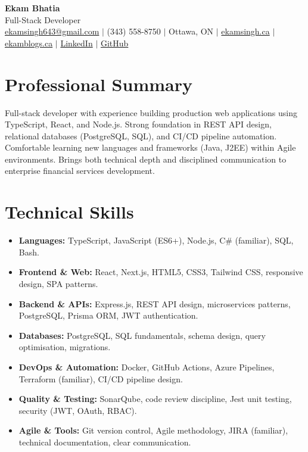 \documentclass[11pt,a4paper]{article}
\begin{document}
\begin{center}
    {\LARGE \textbf{Ekam Bhatia}} \\
    \vspace{2pt}
    {\normalsize Full-Stack Developer} \\
    \vspace{4pt}
    \small
    \href{mailto:ekamsingh643@gmail.com}{ekamsingh643@gmail.com} $|$
    (343) 558-8750 $|$ Ottawa, ON $|$
    \href{https://www.ekamsingh.ca}{ekamsingh.ca} $|$
    \href{https://www.ekamblogs.ca}{ekamblogs.ca} $|$
    \href{https://www.linkedin.com/in/ekam-bhatia-335840168}{LinkedIn} $|$
    \href{https://github.com/bhat0155}{GitHub}
\end{center}

\section{Professional Summary}
Full-stack developer with experience building production web applications using TypeScript, React, and Node.js. Strong foundation in REST API design, relational databases (PostgreSQL, SQL), and CI/CD pipeline automation. Comfortable learning new languages and frameworks (Java, J2EE) within Agile environments. Brings both technical depth and disciplined communication to enterprise financial services development.

\section{Technical Skills}
\begin{itemize}
    \item \textbf{Languages:} TypeScript, JavaScript (ES6+), Node.js, C\# (familiar), SQL, Bash.
    \item \textbf{Frontend \& Web:} React, Next.js, HTML5, CSS3, Tailwind CSS, responsive design, SPA patterns.
    \item \textbf{Backend \& APIs:} Express.js, REST API design, microservices patterns, PostgreSQL, Prisma ORM, JWT authentication.
    \item \textbf{Databases:} PostgreSQL, SQL fundamentals, schema design, query optimisation, migrations.
    \item \textbf{DevOps \& Automation:} Docker, GitHub Actions, Azure Pipelines, Terraform (familiar), CI/CD pipeline design.
    \item \textbf{Quality \& Testing:} SonarQube, code review discipline, Jest unit testing, security (JWT, OAuth, RBAC).
    \item \textbf{Agile \& Tools:} Git version control, Agile methodology, JIRA (familiar), technical documentation, clear communication.
\end{itemize}
\end{document}
